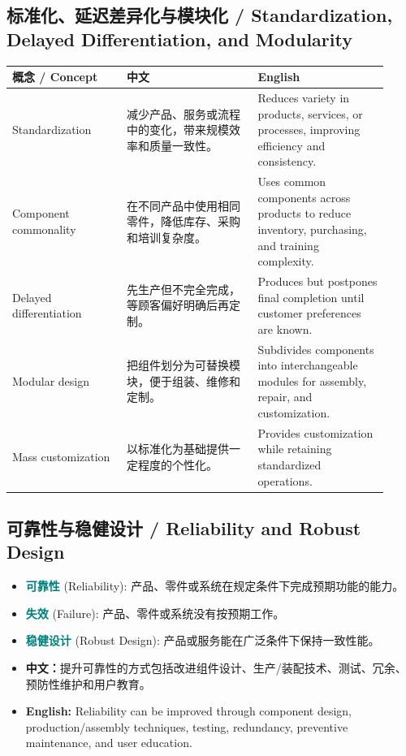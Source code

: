 \documentclass[11pt,a4paper]{ctexart}
\newcommand{\term}[2]{\textbf{\textcolor{Teal}{#1}} \textcolor{Muted}{(#2)}}
\newcommand{\cn}[1]{\textbf{中文：}#1}
\newcommand{\en}[1]{\textbf{English:} #1}
\begin{document}
\subsection{标准化、延迟差异化与模块化 / Standardization, Delayed Differentiation, and Modularity}
\begin{longtable}{L{0.28\linewidth}L{0.32\linewidth}L{0.32\linewidth}}
\toprule
\textbf{概念 / Concept} & \textbf{中文} & \textbf{English} \\
\midrule
Standardization & 减少产品、服务或流程中的变化，带来规模效率和质量一致性。 & Reduces variety in products, services, or processes, improving efficiency and consistency. \\
Component commonality & 在不同产品中使用相同零件，降低库存、采购和培训复杂度。 & Uses common components across products to reduce inventory, purchasing, and training complexity. \\
Delayed differentiation & 先生产但不完全完成，等顾客偏好明确后再定制。 & Produces but postpones final completion until customer preferences are known. \\
Modular design & 把组件划分为可替换模块，便于组装、维修和定制。 & Subdivides components into interchangeable modules for assembly, repair, and customization. \\
Mass customization & 以标准化为基础提供一定程度的个性化。 & Provides customization while retaining standardized operations. \\
\bottomrule
\end{longtable}

\subsection{可靠性与稳健设计 / Reliability and Robust Design}
\begin{itemize}
  \item \term{可靠性}{Reliability}: 产品、零件或系统在规定条件下完成预期功能的能力。
  \item \term{失效}{Failure}: 产品、零件或系统没有按预期工作。
  \item \term{稳健设计}{Robust Design}: 产品或服务能在广泛条件下保持一致性能。
  \item \cn{提升可靠性的方式包括改进组件设计、生产/装配技术、测试、冗余、预防性维护和用户教育。}
  \item \en{Reliability can be improved through component design, production/assembly techniques, testing, redundancy, preventive maintenance, and user education.}
\end{itemize}
\end{document}
